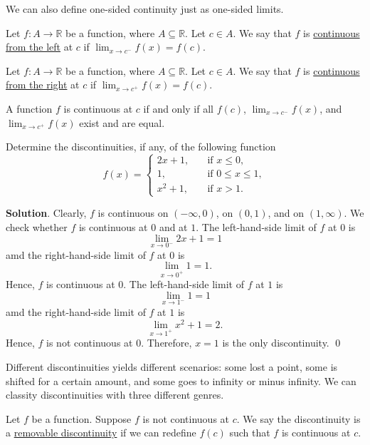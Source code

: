 \documentclass[11pt]{book}
\theoremstyle{break}
\theoremstyle{no_label}
\newcommand{\bbR}{\mathbb{R}}
\numberwithin{equation}{section}
\begin{document}
We can also define one-sided continuity just as one-sided limits.

\begin{definition}
    Let $f:A\to\bbR$ be a function, where $A\subseteq\bbR$. Let $c\in A$. We say that $f$ is \underline{continuous from the left} at $c$ if $\displaystyle\lim_{x\to c^-}f(x)=f(c)$.
\end{definition}

\begin{definition}
    Let $f:A\to\bbR$ be a function, where $A\subseteq\bbR$. Let $c\in A$. We say that $f$ is \underline{continuous from the right} at $c$ if $\displaystyle\lim_{x\to c^+}f(x)=f(c)$.
\end{definition}

\begin{theorem}
    A function $f$ is continuous at $c$ if and only if all $f(c)$, $\displaystyle\lim_{x\to c^-}f(x)$, and $\displaystyle\lim_{x\to c^+}f(x)$ exist and are equal.
\end{theorem}

\begin{example}
    Determine the discontinuities, if any, of the following function $$f(x)=\left\{\begin{array}{rl}
        2x+1,\quad & \text{if $x\leq 0$},\\
        1, \quad & \text{if $0\leq x\leq 1$},\\
        x^2+1, \quad & \text{if $x>1$}.
    \end{array}\right.$$
\end{example}
\textbf{Solution}. Clearly, $f$ is continuous on $(-\infty, 0)$, on $(0, 1)$, and on $(1, \infty)$. We check whether $f$ is continuous at $0$ and at $1$. The left-hand-side limit of $f$ at $0$ is $$\lim_{x\to 0^-}2x+1=1$$ amd the right-hand-side limit of $f$ at $0$ is $$\lim_{x\to 0^+}1=1.$$ Hence, $f$ is continuous at $0$. The left-hand-side limit of $f$ at $1$ is $$\lim_{x\to 1^-}1=1$$ amd the right-hand-side limit of $f$ at $1$ is $$\lim_{x\to 1^+}x^2+1=2.$$ Hence, $f$ is not continuous at $0$. Therefore, $x=1$ is the only discontinuity. \qed

Different discontinuities yields different scenarios: some lost a point, some is shifted for a certain amount, and some goes to infinity or minus infinity. We can classity discontinuities with three different genres.

\begin{definition}
    Let $f$ be a function. Suppose $f$ is not continuous at $c$. We say the discontinuity is a \underline{removable discontinuity} if we can redefine $f(c)$ such that $f$ is continuous at $c$.
\end{definition}
\end{document}
